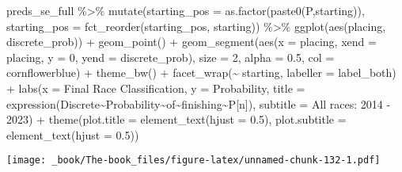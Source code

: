 \documentclass[
]{book}
\newenvironment{Shaded}{\begin{snugshade}}{\end{snugshade}}
\newcommand{\AttributeTok}[1]{\textcolor[rgb]{0.77,0.63,0.00}{#1}}
\newcommand{\DecValTok}[1]{\textcolor[rgb]{0.00,0.00,0.81}{#1}}
\newcommand{\FloatTok}[1]{\textcolor[rgb]{0.00,0.00,0.81}{#1}}
\newcommand{\FunctionTok}[1]{\textcolor[rgb]{0.00,0.00,0.00}{#1}}
\newcommand{\NormalTok}[1]{#1}
\newcommand{\SpecialCharTok}[1]{\textcolor[rgb]{0.00,0.00,0.00}{#1}}
\newcommand{\StringTok}[1]{\textcolor[rgb]{0.31,0.60,0.02}{#1}}
\begin{document}
\begin{Shaded}
\begin{Highlighting}[]
\NormalTok{preds\_se\_full }\SpecialCharTok{\%\textgreater{}\%}
  \FunctionTok{mutate}\NormalTok{(}\AttributeTok{starting\_pos =} \FunctionTok{as.factor}\NormalTok{(}\FunctionTok{paste0}\NormalTok{(}\StringTok{\textquotesingle{}P\textquotesingle{}}\NormalTok{,starting)),}
         \AttributeTok{starting\_pos =} \FunctionTok{fct\_reorder}\NormalTok{(starting\_pos, starting)) }\SpecialCharTok{\%\textgreater{}\%}
  \FunctionTok{ggplot}\NormalTok{(}\FunctionTok{aes}\NormalTok{(placing, discrete\_prob)) }\SpecialCharTok{+}
  \FunctionTok{geom\_point}\NormalTok{() }\SpecialCharTok{+}
  \FunctionTok{geom\_segment}\NormalTok{(}\FunctionTok{aes}\NormalTok{(}\AttributeTok{x =}\NormalTok{ placing, }\AttributeTok{xend =}\NormalTok{ placing, }\AttributeTok{y =} \DecValTok{0}\NormalTok{, }\AttributeTok{yend =}\NormalTok{ discrete\_prob),}
               \AttributeTok{size =} \DecValTok{2}\NormalTok{, }\AttributeTok{alpha =} \FloatTok{0.5}\NormalTok{, }\AttributeTok{col =} \StringTok{\textquotesingle{}cornflowerblue\textquotesingle{}}\NormalTok{) }\SpecialCharTok{+}
  \FunctionTok{theme\_bw}\NormalTok{() }\SpecialCharTok{+}
  \FunctionTok{facet\_wrap}\NormalTok{(}\SpecialCharTok{\textasciitilde{}}\NormalTok{ starting, }\AttributeTok{labeller =}\NormalTok{ label\_both) }\SpecialCharTok{+}
  \FunctionTok{labs}\NormalTok{(}\AttributeTok{x =} \StringTok{\textquotesingle{}Final Race Classification\textquotesingle{}}\NormalTok{,}
       \AttributeTok{y =} \StringTok{\textquotesingle{}Probability\textquotesingle{}}\NormalTok{,}
       \AttributeTok{title =} \FunctionTok{expression}\NormalTok{(Discrete}\SpecialCharTok{\textasciitilde{}}\NormalTok{Probability}\SpecialCharTok{\textasciitilde{}}\NormalTok{of}\SpecialCharTok{\textasciitilde{}}\NormalTok{finishing}\SpecialCharTok{\textasciitilde{}}\NormalTok{P[n]),}
       \AttributeTok{subtitle =} \StringTok{\textquotesingle{}All races: 2014 {-} 2023\textquotesingle{}}\NormalTok{) }\SpecialCharTok{+}
  \FunctionTok{theme}\NormalTok{(}\AttributeTok{plot.title =} \FunctionTok{element\_text}\NormalTok{(}\AttributeTok{hjust =} \FloatTok{0.5}\NormalTok{),}
        \AttributeTok{plot.subtitle =} \FunctionTok{element\_text}\NormalTok{(}\AttributeTok{hjust =} \FloatTok{0.5}\NormalTok{))}
\end{Highlighting}
\end{Shaded}

\texttt{[image: \_book/The-book\_files/figure-latex/unnamed-chunk-132-1.pdf]}
\end{document}
